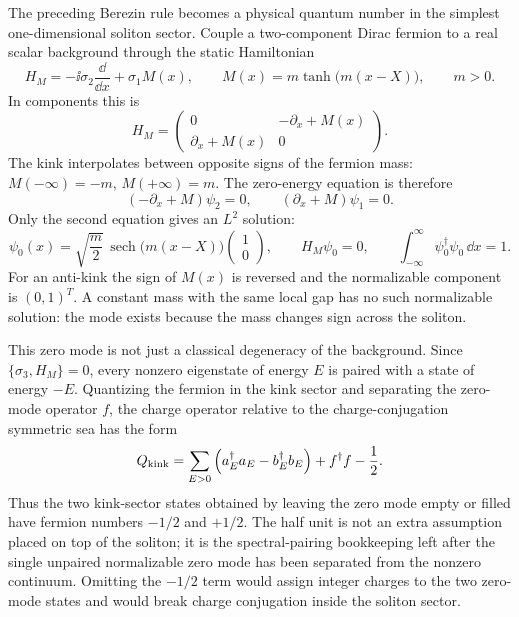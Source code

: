 \begin{example}
\label{ex:jackiw-rebbi-kink-zero-mode}
The preceding Berezin rule becomes a physical quantum number in the simplest
one-dimensional soliton sector.  Couple a two-component Dirac fermion to a
real scalar background through the static Hamiltonian
\begin{equation}
  H_M
  =
  -\ii\sigma_2\frac{\dd}{\dd x}+\sigma_1 M(x),
  \qquad
  M(x)=m\tanh\!\bigl(m(x-X)\bigr),\qquad m>0 .
  \label{eq:jackiw-rebbi-kink-hamiltonian}
\end{equation}
In components this is
\[
  H_M
  =
  \begin{pmatrix}
  0&-\partial_x+M(x)\\
  \partial_x+M(x)&0
  \end{pmatrix}.
\]
The kink interpolates between opposite signs of the fermion mass:
\(M(-\infty)=-m\), \(M(+\infty)=m\).  The zero-energy equation is therefore
\[
  (-\partial_x+M)\psi_2=0,\qquad
  (\partial_x+M)\psi_1=0 .
\]
Only the second equation gives an \(L^2\) solution:
\begin{equation}
  \psi_0(x)
  =
  \sqrt{\frac m2}\,
  \operatorname{sech}\!\bigl(m(x-X)\bigr)
  \begin{pmatrix}1\\0\end{pmatrix},
  \qquad
  H_M\psi_0=0,
  \qquad
  \int_{-\infty}^{\infty}\psi_0^\dagger\psi_0\,\dd x=1 .
  \label{eq:jackiw-rebbi-zero-mode-wavefunction}
\end{equation}
For an anti-kink the sign of \(M(x)\) is reversed and the normalizable
component is \((0,1)^T\).  A constant mass with the same local gap has no such
normalizable solution: the mode exists because the mass changes sign across
the soliton.

This zero mode is not just a classical degeneracy of the background.  Since
\(\{\sigma_3,H_M\}=0\), every nonzero eigenstate of energy \(E\) is paired
with a state of energy \(-E\).  Quantizing the fermion in the kink sector and
separating the zero-mode operator \(f\), the charge operator relative to the
charge-conjugation symmetric sea has the form
\begin{equation}
  Q_{\rm kink}
  =
  \sum_{E>0}
  \left(a_E^\dagger a_E-b_E^\dagger b_E\right)
  +f^\dagger f-\frac12 .
  \label{eq:jackiw-rebbi-half-charge-operator}
\end{equation}
Thus the two kink-sector states obtained by leaving the zero mode empty or
filled have fermion numbers \(-1/2\) and \(+1/2\).  The half unit is not an
extra assumption placed on top of the soliton; it is the spectral-pairing
bookkeeping left after the single unpaired normalizable zero mode has been
separated from the nonzero continuum.  Omitting the \(-1/2\) term would assign
integer charges to the two zero-mode states and would break charge conjugation
inside the soliton sector.
\end{example}

